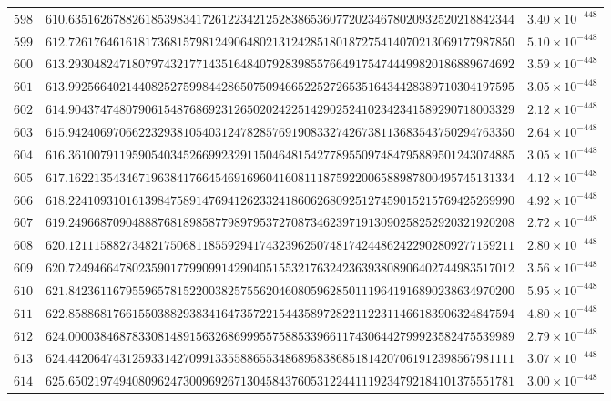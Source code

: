 \documentclass[12pt,reqno]{amsart}
\theoremstyle{remark}
\begin{document}
\begin{longtable}{clc}
$598$ & $610.6351626788261853983417261223421252838653607720234678020932520218842344$ & $3.40\times 10^{-448}$ \\
$599$ & $612.7261764616181736815798124906480213124285180187275414070213069177987850$ & $5.10\times 10^{-448}$ \\
$600$ & $613.2930482471807974321771435164840792839855766491754744499820186889674692$ & $3.59\times 10^{-448}$ \\
$601$ & $613.9925664021440825275998442865075094665225272653516434428389710304197595$ & $3.05\times 10^{-448}$ \\
$602$ & $614.9043747480790615487686923126502024225142902524102342341589290718003329$ & $2.12\times 10^{-448}$ \\
$603$ & $615.9424069706622329381054031247828576919083327426738113683543750294763350$ & $2.64\times 10^{-448}$ \\
$604$ & $616.3610079119590540345266992329115046481542778955097484795889501243074885$ & $3.05\times 10^{-448}$ \\
$605$ & $617.1622135434671963841766454691696041608111875922006588987800495745131334$ & $4.12\times 10^{-448}$ \\
$606$ & $618.2241093101613984758914769412623324186062680925127459015215769425269990$ & $4.92\times 10^{-448}$ \\
$607$ & $619.2496687090488876818985877989795372708734623971913090258252920321920208$ & $2.72\times 10^{-448}$ \\
$608$ & $620.1211158827348217506811855929417432396250748174244862422902809277159211$ & $2.80\times 10^{-448}$ \\
$609$ & $620.7249466478023590177990991429040515532176324236393808906402744983517012$ & $3.56\times 10^{-448}$ \\
$610$ & $621.8423611679559657815220038257556204608059628501119641916890238634970200$ & $5.95\times 10^{-448}$ \\
$611$ & $622.8588681766155038829383416473572215443589728221122311466183906324847594$ & $4.80\times 10^{-448}$ \\
$612$ & $624.0000384687833081489156326869995575885339661174306442799923582475539989$ & $2.79\times 10^{-448}$ \\
$613$ & $624.4420647431259331427099133558865534868958386851814207061912398567981111$ & $3.07\times 10^{-448}$ \\
$614$ & $625.6502197494080962473009692671304584376053122441119234792184101375551781$ & $3.00\times 10^{-448}$ \\

\end{longtable}
\end{document}
